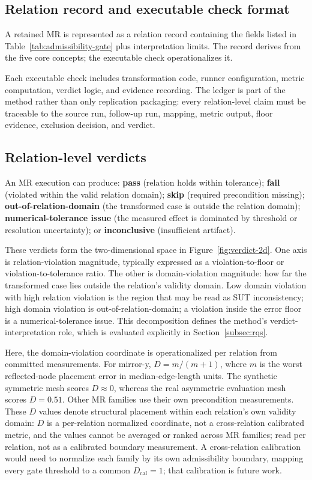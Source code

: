 \documentclass[preprint,12pt,authoryear]{elsarticle}
\begin{document}
\subsection{Relation record and executable check format}
\label{subsec:relation-record}

A retained MR is represented as a relation record containing the fields listed in Table~\ref{tab:admissibility-gate} plus interpretation limits. The record derives from the five core concepts; the executable check operationalizes it.

Each executable check includes transformation code, runner configuration, metric computation, verdict logic, and evidence recording. The ledger is part of the method rather than only replication packaging: every relation-level claim must be traceable to the source run, follow-up run, mapping, metric output, floor evidence, exclusion decision, and verdict.

\subsection{Relation-level verdicts}
\label{subsec:verdicts}

An MR execution can produce: \textbf{pass} (relation holds within tolerance); \textbf{fail} (violated within the valid relation domain); \textbf{skip} (required precondition missing); \textbf{out-of-relation-domain} (the transformed case is outside the relation domain); \textbf{numerical-tolerance issue} (the measured effect is dominated by threshold or resolution uncertainty); or \textbf{inconclusive} (insufficient artifact).

These verdicts form the two-dimensional space in Figure~\ref{fig:verdict-2d}. One axis is relation-violation magnitude, typically expressed as a violation-to-floor or violation-to-tolerance ratio. The other is domain-violation magnitude: how far the transformed case lies outside the relation's validity domain. Low domain violation with high relation violation is the region that may be read as SUT inconsistency; high domain violation is out-of-relation-domain; a violation inside the error floor is a numerical-tolerance issue. This decomposition defines the method's verdict-interpretation role, which is evaluated explicitly in Section~\ref{subsec:rqs}.

Here, the domain-violation coordinate is operationalized per relation from committed measurements. For mirror-y, $D = m/(m+1)$, where $m$ is the worst reflected-node placement error in median-edge-length units. The synthetic symmetric mesh scores $D \approx 0$, whereas the real asymmetric evaluation mesh scores $D = 0.51$. Other MR families use their own precondition measurements. These $D$ values denote structural placement within each relation's own validity domain: $D$ is a per-relation normalized coordinate, not a cross-relation calibrated metric, and the values cannot be averaged or ranked across MR families; read per relation, not as a calibrated boundary measurement. A cross-relation calibration would need to normalize each family by its own admissibility boundary, mapping every gate threshold to a common $D_{\mathrm{cal}} = 1$; that calibration is future work.
\end{document}
